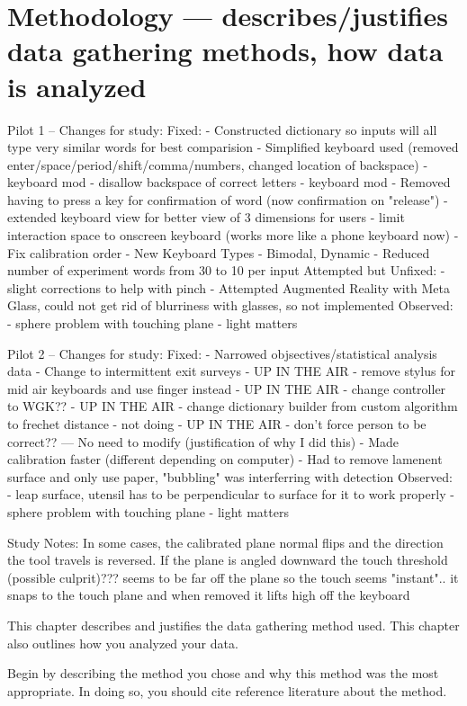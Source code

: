\chapter{Methodology --- describes/justifies data gathering methods, how data is analyzed}

Pilot 1 -- Changes for study:
Fixed:
- Constructed dictionary so inputs will all type very similar words for best comparision
- Simplified keyboard used (removed enter/space/period/shift/comma/numbers, changed location of backspace)
- keyboard mod - disallow backspace of correct letters
- keyboard mod - Removed having to press a key for confirmation of word (now confirmation on "release")
- extended keyboard view for better view of 3 dimensions for users
- limit interaction space to onscreen keyboard (works more like a phone keyboard now)
- Fix calibration order
- New Keyboard Types - Bimodal, Dynamic
- Reduced number of experiment words from 30 to 10 per input
Attempted but Unfixed:
- slight corrections to help with pinch
- Attempted Augmented Reality with Meta Glass, could not get rid of blurriness with glasses, so not implemented
Observed:
- sphere problem with touching plane
- light matters

Pilot 2 -- Changes for study:
Fixed:
- Narrowed objsectives/statistical analysis data
- Change to intermittent exit surveys
- UP IN THE AIR - remove stylus for mid air keyboards and use finger instead
- UP IN THE AIR - change controller to WGK??
- UP IN THE AIR - change dictionary builder from custom algorithm to frechet distance
- not doing - UP IN THE AIR - don't force person to be correct?? --- No need to modify (justification of why I did this)
- Made calibration faster (different depending on computer)
- Had to remove lamenent surface and only use paper, "bubbling" was interferring with detection
Observed:
- leap surface, utensil has to be perpendicular to surface for it to work properly
- sphere problem with touching plane
- light matters

Study Notes:
In some cases, the calibrated plane normal flips and the direction the tool travels is reversed.
If the plane is angled downward the touch threshold (possible culprit)??? seems to be far off the plane so the touch seems "instant".. it snaps to the touch plane and when removed it lifts high off the keyboard

 This chapter describes and justifies the data gathering method used. This chapter also outlines how you
analyzed your data.

 Begin by describing the method you chose and why this method was the most appropriate. In doing so, you
should cite reference literature about the method.

